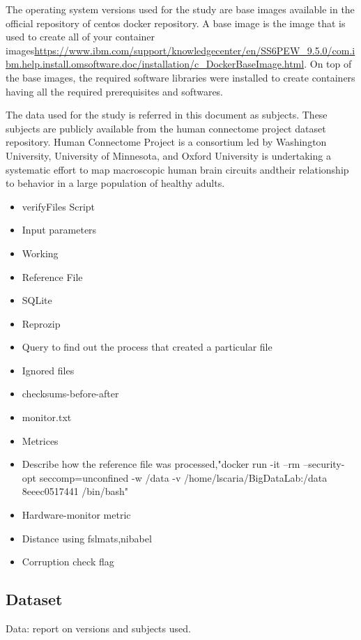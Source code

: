 \documentclass{article}
\begin{document}
The operating system versions used for the study are base images available in the official repository of centos docker repository. A base image is the image that is used to create all of your container images\url{https://www.ibm.com/support/knowledgecenter/en/SS6PEW\_9.5.0/com.ibm.help.install.omsoftware.doc/installation/c\_DockerBaseImage.html}. On top of the base images, the required software libraries were installed to create containers having all the required prerequisites and softwares.

The data used for the study is referred in this document as subjects. These subjects are publicly available from the human connectome project dataset repository. Human Connectome Project\cite{The WU-Minn Human Connectome Project: An Overview} is a consortium led by Washington University, University of Minnesota, and Oxford University is undertaking a systematic effort to map macroscopic human brain circuits andtheir relationship to behavior in a large population of healthy adults.

\begin{itemize}
  \item{verifyFiles Script}
  \item{Input parameters}
  \item{Working}
  \item{Reference File}
  \item{SQLite}
  \item{Reprozip}
  \item{Query to find out the process that created a particular file}
  \item{Ignored files}
  \item{checksums-before-after}
  \item{monitor.txt}
  \item{Metrices}
  \item{Describe how the reference file was processed,"docker run -it --rm --security-opt seccomp=unconfined -w /data -v /home/lscaria/BigDataLab:/data 8eeec0517441 /bin/bash"}
  \item{Hardware-monitor metric}
  \item{Distance using fslmats,nibabel}
  \item{Corruption check flag}
\end{itemize}
\subsection{Dataset}

Data: report on versions and subjects used.
\end{document}
